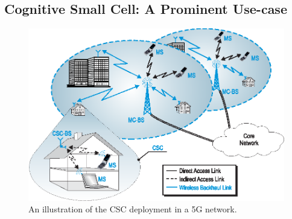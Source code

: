 \subsection{Cognitive Small Cell: A Prominent Use-case}
\begin{figure}[!t]
\centering
\includegraphics[width = \columnwidth]{figures/Cellular_Scenario_CR6F}
\caption{An illustration of the CSC deployment in a 5G network.}
\label{fig:scenario}
\end{figure}



